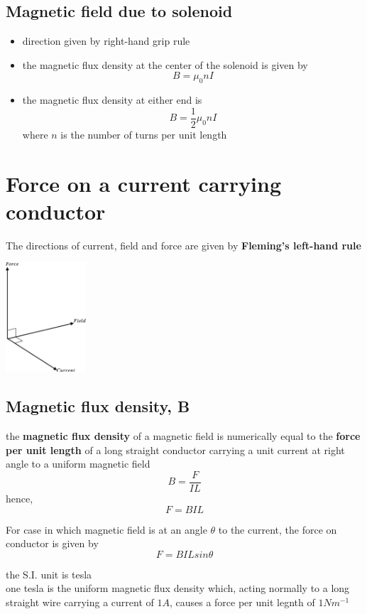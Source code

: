 \documentclass[a4paper, 10pt]{article}
\begin{document}
\subsection{Magnetic field due to solenoid}

\begin{itemize}
   \item direction given by right-hand grip rule
   \item the magnetic flux density at the center of the solenoid is given by
      \[
      B = \mu_0 n I 
      \]
   \item the magnetic flux density at either end is
      \[
      B = \frac{1}{2} \mu_0 n I
      \]
   where $n$ is the number of turns per unit length
      
\end{itemize}	


\section{Force on a current carrying conductor}
\begin{framed}
The directions of current, field and force are given by \textbf{Fleming's left-hand rule}
\begin{center}
   \includegraphics[width=3cm]{figures/2.pdf} 
\end{center}	
\end{framed}	

\subsection{Magnetic flux density, B}
\begin{framed}
   the \textbf{magnetic flux density} of a magnetic field is numerically equal to the \textbf{force per unit length} of a long straight conductor carrying a unit current at right angle to a uniform magnetic field
   \[
   B = \frac{F}{IL}
   \]
   hence,
   \[
   F = BIL
   \]
   

   For case in which magnetic field is at an angle $\theta$ to the current, the force on conductor is given by
   \[
   F = BIL sin \theta
   \]
   

   the S.I. unit is tesla \\
   one tesla is the uniform magnetic flux density which, acting normally to a long straight wire carrying a current of $1A$, causes a force per unit legnth of $1Nm^{-1}$ 
\end{framed}	
\end{document}
